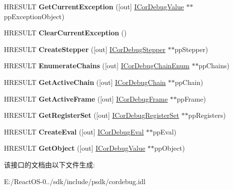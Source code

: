 \begin{DoxyCompactItemize}
H\+R\+E\+S\+U\+LT {\bfseries Get\+Current\+Exception} (\mbox{[}out\mbox{]} \hyperlink{interface_i_cor_debug_value}{I\+Cor\+Debug\+Value} $\ast$$\ast$pp\+Exception\+Object)
\item 
\mbox{\label{interface_i_cor_debug_thread_a6caaf11f75eb227c29850ae0eb10ae2a}} 
H\+R\+E\+S\+U\+LT {\bfseries Clear\+Current\+Exception} ()
\item 
\mbox{\label{interface_i_cor_debug_thread_a7e42f3985a7a47622705aa99b20a25a9}} 
H\+R\+E\+S\+U\+LT {\bfseries Create\+Stepper} (\mbox{[}out\mbox{]} \hyperlink{interface_i_cor_debug_stepper}{I\+Cor\+Debug\+Stepper} $\ast$$\ast$pp\+Stepper)
\item 
\mbox{\label{interface_i_cor_debug_thread_aa0246cc5e22a20559eee4f4e3952d19e}} 
H\+R\+E\+S\+U\+LT {\bfseries Enumerate\+Chains} (\mbox{[}out\mbox{]} \hyperlink{interface_i_cor_debug_chain_enum}{I\+Cor\+Debug\+Chain\+Enum} $\ast$$\ast$pp\+Chains)
\item 
\mbox{\label{interface_i_cor_debug_thread_a71288f19e0836d1ab22d149cbee18bd4}} 
H\+R\+E\+S\+U\+LT {\bfseries Get\+Active\+Chain} (\mbox{[}out\mbox{]} \hyperlink{interface_i_cor_debug_chain}{I\+Cor\+Debug\+Chain} $\ast$$\ast$pp\+Chain)
\item 
\mbox{\label{interface_i_cor_debug_thread_a7f836c06c52aff765adc76f097c22a32}} 
H\+R\+E\+S\+U\+LT {\bfseries Get\+Active\+Frame} (\mbox{[}out\mbox{]} \hyperlink{interface_i_cor_debug_frame}{I\+Cor\+Debug\+Frame} $\ast$$\ast$pp\+Frame)
\item 
\mbox{\label{interface_i_cor_debug_thread_ae20bb584e05ed5d1f4e5d74c73f1c76b}} 
H\+R\+E\+S\+U\+LT {\bfseries Get\+Register\+Set} (\mbox{[}out\mbox{]} \hyperlink{interface_i_cor_debug_register_set}{I\+Cor\+Debug\+Register\+Set} $\ast$$\ast$pp\+Registers)
\item 
\mbox{\label{interface_i_cor_debug_thread_ae1032c1a659a2c5d2e59c5fb3cd01485}} 
H\+R\+E\+S\+U\+LT {\bfseries Create\+Eval} (\mbox{[}out\mbox{]} \hyperlink{interface_i_cor_debug_eval}{I\+Cor\+Debug\+Eval} $\ast$$\ast$pp\+Eval)
\item 
\mbox{\label{interface_i_cor_debug_thread_af028212331bbbdbcc39c9f3a4470d1c8}} 
H\+R\+E\+S\+U\+LT {\bfseries Get\+Object} (\mbox{[}out\mbox{]} \hyperlink{interface_i_cor_debug_value}{I\+Cor\+Debug\+Value} $\ast$$\ast$pp\+Object)
\end{DoxyCompactItemize}


该接口的文档由以下文件生成\+:\begin{DoxyCompactItemize}
\item 
E\+:/\+React\+O\+S-\/0../sdk/include/psdk/cordebug.\+idl\end{DoxyCompactItemize}
